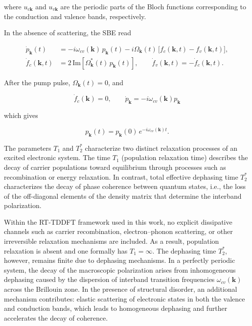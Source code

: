 where $u_{c\mathbf k}$ and $u_{v\mathbf k}$ are the periodic parts of the Bloch
functions corresponding to the conduction and valence bands, respectively.

In the absence of scattering, the SBE read \cite{HaugKoch2009,RossiKuhn2002}

\begin{align}
\dot p_{\mathbf{k}}(t)
&=
-i\omega_{cv}(\mathbf{k})\,p_{\mathbf{k}}(t)
-i\Omega_{\mathbf{k}}(t)\,\big[f_c(\mathbf{k},t)-f_v(\mathbf{k},t)\big],
\\
\dot f_c(\mathbf{k},t)
&=
2\,\mathrm{Im}\!\left[\Omega_{\mathbf{k}}^*(t)\,p_{\mathbf{k}}(t)\right],
\qquad
\dot f_v(\mathbf{k},t)=-\dot f_c(\mathbf{k},t).
\end{align}

After the pump pulse, $\Omega_{\mathbf{k}}(t)=0$, and

\begin{equation}
\dot f_c(\mathbf{k})=0, \qquad \dot p_{\mathbf{k}}=-i\omega_{cv}(\mathbf{k})p_{\mathbf{k}}
\end{equation}

which gives 

\begin{equation}
p_{\mathbf{k}}(t)=p_{\mathbf{k}}(0)\,e^{-i\omega_{cv}(\mathbf{k})t}.
\end{equation}


The parameters $T_1$ and $T_2^*$ characterize two distinct relaxation processes of an excited electronic system. The time $T_1$ (population relaxation time) describes the decay of carrier populations toward equilibrium through processes such as recombination or energy relaxation. In contrast, total effective dephasing time $T_2^*$ characterizes the decay of phase coherence between quantum states, i.e., the loss of the off-diagonal elements of the density matrix that determine the interband polarization.

Within the RT-TDDFT framework used in this work, no explicit dissipative channels such as carrier recombination, electron–phonon scattering, or other irreversible relaxation mechanisms are included. As a result, population relaxation is absent and one formally has $T_1=\infty$. The dephasing time $T_2^*$, however, remains finite due to dephasing mechanisms. In a perfectly periodic system, the decay of the macroscopic polarization arises from inhomogeneous dephasing caused by the dispersion of interband transition frequencies $\omega_{cv}(\mathbf{k})$ across the Brillouin zone. In the presence of structural disorder, an additional mechanism contributes: elastic scattering of electronic states in both the valence and conduction bands, which leads to homogeneous dephasing and further accelerates the decay of coherence.


